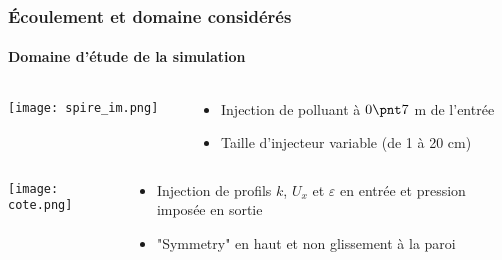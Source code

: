 \documentclass[12pt, xcolor=svgnames]{beamer}
\newcommand{\warrow}{\item[\color{blue!50!black!70} \tiny{\ding{109}}]}
\begin{document}
\begin{frame}
  \frametitle{Écoulement et domaine considérés}
  \framesubtitle{Domaine d'étude de la simulation} 

\begin{columns}
\begin{column}{0.55\textwidth}
\centering
\texttt{[image: spire\_im.png]}
\end{column}
\begin{column}{0.4\textwidth}
\begin{itemize}
	\warrow \footnotesize{Injection de polluant à $0\pnt 7$ m de l'entrée}
	\warrow \footnotesize{Taille d'injecteur variable (de 1 à 20 cm)}
\end{itemize}
\end{column}
\end{columns}

  
\begin{columns}

\begin{column}{0.55\textwidth}
\vspace{-0.5cm}\begin{flushleft}
	\texttt{[image: cote.png]} 
\end{flushleft}
\end{column}

\begin{column}{0.4\textwidth}
\begin{itemize}	
	\warrow \footnotesize{Injection de profils $k$, $U_x$ et $\varepsilon$ en entrée et pression imposée en sortie}
	\warrow \footnotesize{"Symmetry" en haut et non glissement à la paroi}
	\end{itemize}
\end{column}

\end{columns}
	
\end{frame}
\end{document}
